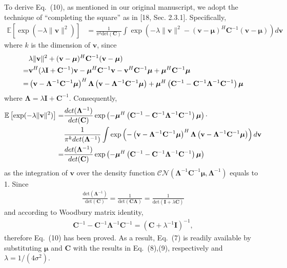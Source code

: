 \documentclass[onecolumn, 11pt, draftclsnofoot]{IEEEtran}
\begin{document}
To derive Eq.~(10), as mentioned in our original manuscript, we adopt the
technique of ``completing the square'' as in [18, Sec. 2.3.1]. Specifically,
\begin{align}
  \mathbb{E}\left[\exp(-\lambda\|\mathbf{v}\|^2)\right] & =
  \frac{1}{\pi^k\mbox{det}(\mathbf{C})}\int \exp\left(-\lambda\|\mathbf{v}\|^2 -
  (\mathbf{v} -
  \bm{\mu})^H\mathbf{C}^{-1} (\mathbf{v} - \bm{\mu})\right)d\mathbf{v}
\end{align}
where $k$ is the dimension of $\mathbf{v}$, since
\begin{align}
  & \lambda\|\mathbf{v}\|^2 + (\mathbf{v} - \bm{\mu})^H\mathbf{C}^{-1}
  (\mathbf{v} - \bm{\mu}) \notag \\
  =& \mathbf{v}^H
  (\lambda\mathbf{I} + \mathbf{C}^{-1})\mathbf{v} -
  \bm{\mu}^H\mathbf{C}^{-1}\mathbf{v} - \mathbf{v}^H\mathbf{C}^{-1}\bm{\mu} +
  \bm{\mu}^H\mathbf{C}^{-1}\bm{\mu} \notag\\
  =& \left(\mathbf{v} - \mathbf{\Lambda}^{-1}\mathbf{C}^{-1}\bm{\mu}\right)^H
  \mathbf{\Lambda} \left(\mathbf{v} -
  \mathbf{\Lambda}^{-1}\mathbf{C}^{-1}\bm{\mu}\right) +
  \bm{\mu}^H\left(\mathbf{C}^{-1} - \mathbf{C}^{-1} \mathbf{\Lambda}^{-1}
  \mathbf{C}^{-1} \right) \bm{\mu}
\end{align}
where $\mathbf{\Lambda} = \lambda\mathbf{I} + \mathbf{C}^{-1}$. Consequently,
\begin{align}
  \mathbb{E}\left[\exp(-\lambda\|\mathbf{v}\|^2)\right] = &
  \frac{\relax{det}(\mathbf{\Lambda}^{-1})}{\relax{det}(\mathbf{C})}
  \exp\left(-\bm{\mu}^H\left(\mathbf{C}^{-1} - \mathbf{C}^{-1} \mathbf{\Lambda}^{-1}
  \mathbf{C}^{-1} \right) \bm{\mu} \right) \cdot
  \notag \\
  & \frac{1}{\pi^k\relax{det}(\mathbf{\Lambda}^{-1})} \int
  \exp\left(-\left(\mathbf{v} -
  \mathbf{\Lambda}^{-1}\mathbf{C}^{-1}\bm{\mu}\right)^H \mathbf{\Lambda}
  \left(\mathbf{v} - \mathbf{\Lambda}^{-1}\mathbf{C}^{-1}\bm{\mu}\right) \right)
  d\mathbf{v} \notag \\
  = & \frac{\relax{det}(\mathbf{\Lambda}^{-1})}{\relax{det}(\mathbf{C})}
  \exp\left(-\bm{\mu}^H\left(\mathbf{C}^{-1} - \mathbf{C}^{-1} \mathbf{\Lambda}^{-1}
  \mathbf{C}^{-1} \right) \bm{\mu} \right) 
\end{align}
as the integration of $\mathbf{v}$ over the density function
$\mathcal{CN}(\mathbf{\Lambda}^{-1}\mathbf{C}^{-1}\bm{\mu},
\mathbf{\Lambda}^{-1})$ equals to 1. Since 
\begin{align}
  \frac{\mbox{det}(\mathbf{\Lambda}^{-1})}{\mbox{det}(\mathbf{C})} =
  \frac{1}{\mbox{det}(\mathbf{C\Lambda})} =
  \frac{1}{\mbox{det}(\mathbf{I} + \lambda \mathbf{C})}
\end{align}
and according to Woodbury matrix identity,
\begin{align}
  \mathbf{C}^{-1} - \mathbf{C}^{-1} \mathbf{\Lambda}^{-1}
  \mathbf{C}^{-1} = \left(\mathbf{C} + \lambda^{-1}\mathbf{I}\right)^{-1},
\end{align}
therefore Eq.~(10) has been proved. As a result, Eq.~(7) is readily available by
substituting $\bm{\mu}$ and $\mathbf{C}$ with the results in Eq.~(8),(9),
respectively and $\lambda=1/(4\sigma^2)$.
\vspace{0.5cm}
\end{document}
